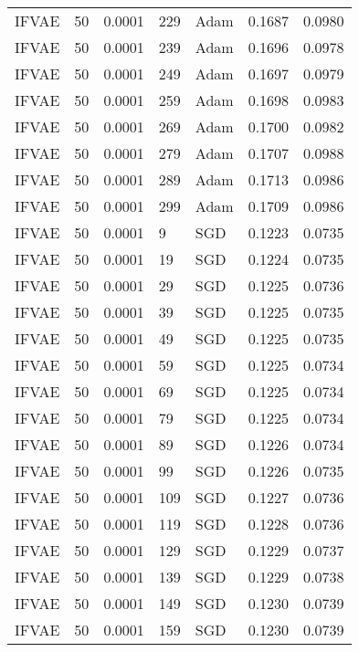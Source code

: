 \begin{tabular}{llrllrr}
 IFVAE &   50 &  0.0001 &   229 &      Adam &  0.1687 &       0.0980 \\
 IFVAE &   50 &  0.0001 &   239 &      Adam &  0.1696 &       0.0978 \\
 IFVAE &   50 &  0.0001 &   249 &      Adam &  0.1697 &       0.0979 \\
 IFVAE &   50 &  0.0001 &   259 &      Adam &  0.1698 &       0.0983 \\
 IFVAE &   50 &  0.0001 &   269 &      Adam &  0.1700 &       0.0982 \\
 IFVAE &   50 &  0.0001 &   279 &      Adam &  0.1707 &       0.0988 \\
 IFVAE &   50 &  0.0001 &   289 &      Adam &  0.1713 &       0.0986 \\
 IFVAE &   50 &  0.0001 &   299 &      Adam &  0.1709 &       0.0986 \\
 IFVAE &   50 &  0.0001 &     9 &       SGD &  0.1223 &       0.0735 \\
 IFVAE &   50 &  0.0001 &    19 &       SGD &  0.1224 &       0.0735 \\
 IFVAE &   50 &  0.0001 &    29 &       SGD &  0.1225 &       0.0736 \\
 IFVAE &   50 &  0.0001 &    39 &       SGD &  0.1225 &       0.0735 \\
 IFVAE &   50 &  0.0001 &    49 &       SGD &  0.1225 &       0.0735 \\
 IFVAE &   50 &  0.0001 &    59 &       SGD &  0.1225 &       0.0734 \\
 IFVAE &   50 &  0.0001 &    69 &       SGD &  0.1225 &       0.0734 \\
 IFVAE &   50 &  0.0001 &    79 &       SGD &  0.1225 &       0.0734 \\
 IFVAE &   50 &  0.0001 &    89 &       SGD &  0.1226 &       0.0734 \\
 IFVAE &   50 &  0.0001 &    99 &       SGD &  0.1226 &       0.0735 \\
 IFVAE &   50 &  0.0001 &   109 &       SGD &  0.1227 &       0.0736 \\
 IFVAE &   50 &  0.0001 &   119 &       SGD &  0.1228 &       0.0736 \\
 IFVAE &   50 &  0.0001 &   129 &       SGD &  0.1229 &       0.0737 \\
 IFVAE &   50 &  0.0001 &   139 &       SGD &  0.1229 &       0.0738 \\
 IFVAE &   50 &  0.0001 &   149 &       SGD &  0.1230 &       0.0739 \\
 IFVAE &   50 &  0.0001 &   159 &       SGD &  0.1230 &       0.0739 \\

\end{tabular}

